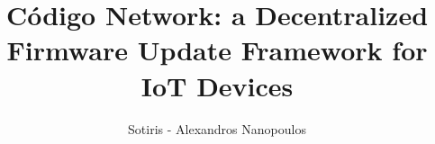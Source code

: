 \documentclass[msc, deptreport,parskip]{infthesis}
\title{Código Network: a Decentralized Firmware Update Framework for IoT Devices}
\author{Sotiris - Alexandros Nanopoulos}
\begin{document}
\begin{preliminary}

\maketitle




\tableofcontents


\end{preliminary}









%







\end{document}
